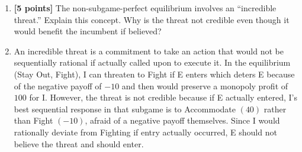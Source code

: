 \documentclass[11pt]{article}
\begin{document}
\begin{enumerate}[label=(\alph*)]
    \item \textbf{[5 points]} The non-subgame-perfect equilibrium involves an ``incredible threat.'' Explain this concept. Why is the threat not credible even though it would benefit the incumbent if believed?
    \item[] An incredible threat is a commitment to take an action that would not be sequentially rational if actually called upon to execute it. In the equilibrium (Stay Out, Fight), I can threaten to Fight if E enters which deters E because of the negative payoff of $-10$ and then would preserve a monopoly profit of $100$ for I. However, the threat is not credible because if E actually entered, I's best sequential response in that subgame is to Accommodate $(40)$ rather than Fight $(-10)$, afraid of a negative payoff themselves. Since I would rationally deviate from Fighting if entry actually occurred, E should not believe the threat and should enter.
    

\end{enumerate}
\end{document}
